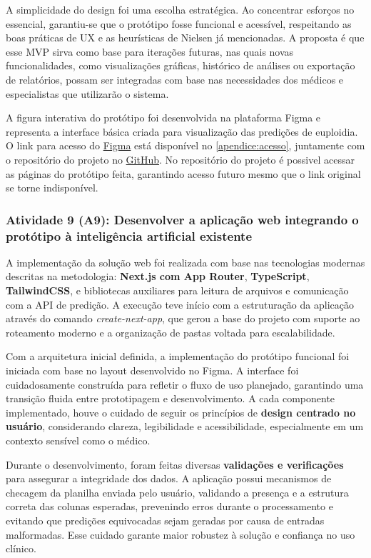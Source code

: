 A simplicidade do design foi uma escolha estratégica. Ao concentrar esforços no essencial, garantiu-se que o protótipo fosse funcional e acessível, respeitando as boas práticas de UX e as heurísticas de Nielsen já mencionadas. A proposta é que esse MVP sirva como base para iterações futuras, nas quais novas funcionalidades, como visualizações gráficas, histórico de análises ou exportação de relatórios, possam ser integradas com base nas necessidades dos médicos e especialistas que utilizarão o sistema.

A figura interativa do protótipo foi desenvolvida na plataforma Figma e representa a interface básica criada para visualização das predições de euploidia. O link para acesso do \href{https://www.figma.com/design/0AstYynXwZO9zVudP1NimJ/Predi%C3%A7%C3%A3o-de-Ploidia}{Figma} está disponível no \autoref{apendice:acesso}, juntamente com o repositório do projeto no \href{https://github.com/CedisUnB/embryo-predictor}{GitHub}. No repositório do projeto é possivel acessar as páginas do protótipo feita, garantindo acesso futuro mesmo que o link original se torne indisponível.

\subsubsection{Atividade 9 (A9):  Desenvolver a aplicação web integrando o protótipo à inteligência artificial existente}
A implementação da solução web foi realizada com base nas tecnologias modernas descritas na metodologia: \textbf{Next.js com App Router}, \textbf{TypeScript}, \textbf{TailwindCSS}, e bibliotecas auxiliares para leitura de arquivos e comunicação com a API de predição. A execução teve início com a estruturação da aplicação através do comando \textit{create-next-app}, que gerou a base do projeto com suporte ao roteamento moderno e a organização de pastas voltada para escalabilidade.

Com a arquitetura inicial definida, a implementação do protótipo funcional foi iniciada com base no layout desenvolvido no Figma. A interface foi cuidadosamente construída para refletir o fluxo de uso planejado, garantindo uma transição fluida entre prototipagem e desenvolvimento. A cada componente implementado, houve o cuidado de seguir os princípios de \textbf{design centrado no usuário}, considerando clareza, legibilidade e acessibilidade, especialmente em um contexto sensível como o médico.

Durante o desenvolvimento, foram feitas diversas \textbf{validações e verificações} para assegurar a integridade dos dados. A aplicação possui mecanismos de checagem da planilha enviada pelo usuário, validando a presença e a estrutura correta das colunas esperadas, prevenindo erros durante o processamento e evitando que predições equivocadas sejam geradas por causa de entradas malformadas. Esse cuidado garante maior robustez à solução e confiança no uso clínico.

